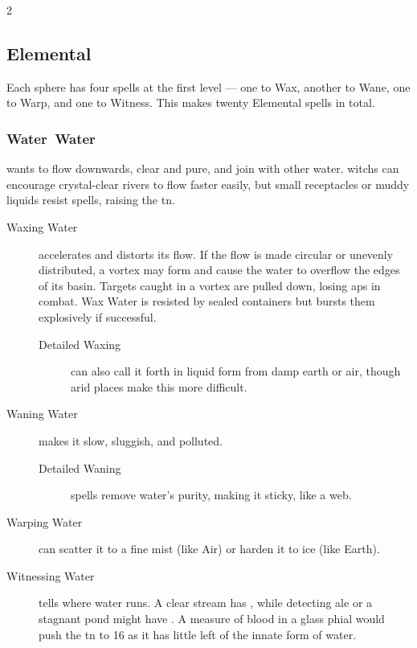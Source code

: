 \begin{multicols}{2}

\subsection{Elemental }

\noindent
Each \gls{sphere} has four \glspl{spell} at the first level --- one to Wax, another to Wane, one to Warp, and one to Witness.
This makes twenty Elemental \glspl{spell} in total.

\subsubsection[Water]{\gls{Water}~Water}
wants to flow downwards, clear and pure, and join with other water.
\Glspl{witch} can encourage crystal-clear rivers to flow faster easily, but small receptacles or muddy liquids resist \glspl{spell}, raising the \gls{tn}.

\begin{description}
  \item[Waxing Water]
  accelerates and distorts its flow. If the flow is made circular or unevenly
  distributed, a vortex may form and cause the water to overflow the edges of
  its basin.  Targets caught in a vortex are pulled down, losing \glspl{ap} in
  combat.  Wax Water is resisted by sealed containers but bursts them
  explosively if successful.

  \begin{description}
    \item[Detailed Waxing]
    can also call it forth in liquid form from damp earth or air, though arid
    places make this more difficult.
  \end{description}

  \item[Waning Water]
  makes it slow, sluggish, and polluted.

  \begin{description}
    \item[Detailed Waning]
    \glspl{spell} remove water's purity, making it sticky, like a web.
  \end{description}

  \item[Warping Water]
  can scatter it to a fine mist (like Air) or harden it to ice (like Earth).

  \item[Witnessing Water]
  tells  where water runs.
  A clear stream has \tn[7], while detecting ale or a stagnant pond might have \tn[10].
  A measure of blood in a glass phial would push the \gls{tn} to 16 as it has little left of the innate form of water.
\end{description}


\end{multicols}
